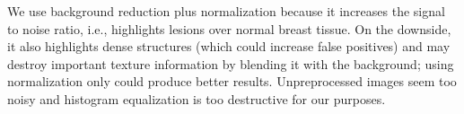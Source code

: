 We use background reduction plus normalization because it increases the signal to noise ratio, i.e., highlights lesions over normal breast tissue. On the downside, it also highlights dense structures (which could increase false positives) and may destroy important texture information by blending it with the background; using normalization only could produce better results. Unpreprocessed images seem too noisy and histogram equalization is too destructive for our purposes.





	
